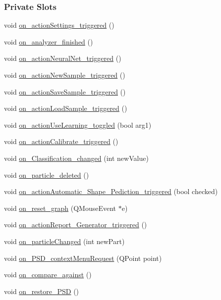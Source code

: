 \subsubsection*{Private Slots}
\begin{DoxyCompactItemize}
\item 
void \hyperlink{class_v_s_a_main_window_a5f8da8de2112e083b8bf1851a7fb123c}{on\+\_\+action\+Settings\+\_\+triggered} ()
\item 
void \hyperlink{class_v_s_a_main_window_a33a4896e2b25348d5e1344e4b37bbd33}{on\+\_\+analyzer\+\_\+finished} ()
\item 
void \hyperlink{class_v_s_a_main_window_a131d34b899c7b16b58ff317d77486529}{on\+\_\+action\+Neural\+Net\+\_\+triggered} ()
\item 
void \hyperlink{class_v_s_a_main_window_a671264c6cb0136f83fc24075545c8c0c}{on\+\_\+action\+New\+Sample\+\_\+triggered} ()
\item 
void \hyperlink{class_v_s_a_main_window_a343178f350d9f2cb3067c75f995169f3}{on\+\_\+action\+Save\+Sample\+\_\+triggered} ()
\item 
void \hyperlink{class_v_s_a_main_window_a09c50b7552a1636c01c4f2f2817a223c}{on\+\_\+action\+Load\+Sample\+\_\+triggered} ()
\item 
void \hyperlink{class_v_s_a_main_window_ae995dc5e5832a1be3a77c36f7df5f982}{on\+\_\+action\+Use\+Learning\+\_\+toggled} (bool arg1)
\item 
void \hyperlink{class_v_s_a_main_window_a0051e5a6f9f17e898e962da6debb8d8b}{on\+\_\+action\+Calibrate\+\_\+triggered} ()
\item 
void \hyperlink{class_v_s_a_main_window_af670cbc8db47377e395cadd2d4c59772}{on\+\_\+\+Classification\+\_\+changed} (int new\+Value)
\item 
void \hyperlink{class_v_s_a_main_window_afb86baadff8bf9e00b4d487de68e5b80}{on\+\_\+particle\+\_\+deleted} ()
\item 
void \hyperlink{class_v_s_a_main_window_a5aa928cf40e92cd184f1f959b87d9acf}{on\+\_\+action\+Automatic\+\_\+\+Shape\+\_\+\+Pediction\+\_\+triggered} (bool checked)
\item 
void \hyperlink{class_v_s_a_main_window_ad7658d814c3f41b673ba3d888ef68b00}{on\+\_\+reset\+\_\+graph} (Q\+Mouse\+Event $\ast$e)
\item 
void \hyperlink{class_v_s_a_main_window_aaeec63d325c863eba2b1bce5e0eaa05e}{on\+\_\+action\+Report\+\_\+\+Generator\+\_\+triggered} ()
\item 
void \hyperlink{class_v_s_a_main_window_a5fcffc892d83090533418aa159c11bf0}{on\+\_\+particle\+Changed} (int new\+Part)
\item 
void \hyperlink{class_v_s_a_main_window_a8d9025970a6a3b27c1f83a92df6c1bad}{on\+\_\+\+P\+S\+D\+\_\+context\+Menu\+Request} (Q\+Point point)
\item 
void \hyperlink{class_v_s_a_main_window_a26fbb5e4ad62a0aeef99b8ae23c0e85e}{on\+\_\+compare\+\_\+against} ()
\item 
void \hyperlink{class_v_s_a_main_window_ad336ffb25b343972e0dbd6d2584a492e}{on\+\_\+restore\+\_\+\+P\+S\+D} ()
\end{DoxyCompactItemize}
